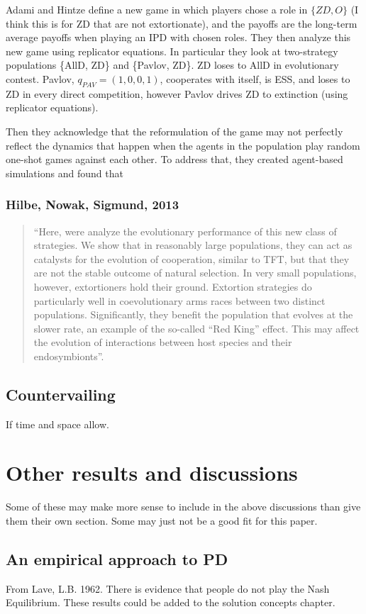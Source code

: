Adami and Hintze define a new game in which players chose a role in $\{ZD, O\}$ (I think this is for ZD that are not extortionate), and the payoffs are the long-term average payoffs when playing an IPD with chosen roles. They then analyze this new game using replicator equations. In particular they look at two-strategy populations \{AllD, ZD\} and \{Pavlov, ZD\}. ZD loses to AllD in evolutionary contest. Pavlov, $q_{PAV} = (1, 0, 0, 1)$, cooperates with itself, is ESS, and loses to ZD in every direct competition, however Pavlov drives ZD to extinction (using replicator equations).

Then they acknowledge that the reformulation of the game may not perfectly reflect the dynamics that happen when the agents in the population play random one-shot games against each other. To address that, they created agent-based simulations and found that 


\subsection{Hilbe, Nowak, Sigmund, 2013}
\begin{quote}``Here, were analyze the evolutionary performance of this new class of strategies. We show that in reasonably large populations, they can act as catalysts for the evolution of cooperation, similar to TFT, but that they are not the stable outcome of natural selection. In very small populations, however, extortioners hold their ground. Extortion strategies do particularly well in coevolutionary arms races between two distinct populations. Significantly, they benefit the population that evolves at the slower rate, an example of the so-called ``Red King'' effect. This may affect the evolution of interactions between host species and their endosymbionts''.
\end{quote}

\section{Countervailing}
If time and space allow.

\chapter{Other results and discussions}
Some of these may make more sense to include in the above discussions than give them their own section. Some may just not be a good fit for this paper.
\section{An empirical approach to PD}
From Lave, L.B. 1962. There is evidence that people do not play the Nash Equilibrium. These results could be added to the solution concepts chapter.

